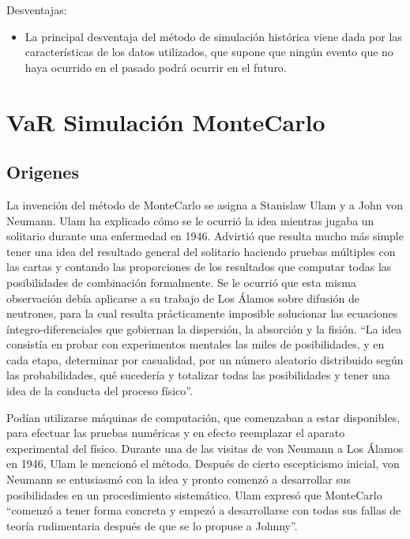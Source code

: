 \documentclass[
  12pt,
]{krantz}
\providecommand{\tightlist}{%
  \setlength{\itemsep}{0pt}\setlength{\parskip}{0pt}}
\begin{document}
Desventajas:

\begin{itemize}
\tightlist
\item
  La principal desventaja del método de simulación histórica viene dada por las características de los datos utilizados, que supone que ningún evento que no haya ocurrido en el pasado podrá ocurrir en el futuro.
\end{itemize}

\hypertarget{var-simulacion-montecarlo}{%
\section{VaR Simulación MonteCarlo}\label{var-simulacion-montecarlo}}

\hypertarget{origenes}{%
\subsection{Origenes}\label{origenes}}

La invención del método de MonteCarlo se asigna a Stanislaw Ulam y a John von Neumann. Ulam ha explicado cómo se le ocurrió la idea mientras jugaba un solitario durante una enfermedad en 1946. Advirtió que resulta mucho más simple tener una idea del resultado general del solitario haciendo pruebas múltiples con las cartas y contando las proporciones de los resultados que computar todas las posibilidades de combinación formalmente. Se le ocurrió que esta misma observación debía aplicarse a su trabajo de Los Álamos sobre difusión de neutrones, para la cual resulta prácticamente imposible solucionar las ecuaciones íntegro-diferenciales que gobiernan la dispersión, la absorción y la fisión. ``La idea consistía en probar con experimentos mentales las miles de posibilidades, y en cada etapa, determinar por casualidad, por un número aleatorio distribuido según las probabilidades, qué sucedería y totalizar todas las posibilidades y tener una idea de la conducta del proceso físico''.

Podían utilizarse máquinas de computación, que comenzaban a estar disponibles, para efectuar las pruebas numéricas y en efecto reemplazar el aparato experimental del físico. Durante una de las visitas de von Neumann a Los Álamos en 1946, Ulam le mencionó el método. Después de cierto escepticismo inicial, von Neumann se entusiasmó con la idea y pronto comenzó a desarrollar sus posibilidades en un procedimiento sistemático. Ulam expresó que MonteCarlo ``comenzó a tener forma concreta y empezó a desarrollarse con todas sus fallas de teoría rudimentaria después de que se lo propuse a Johnny''.
\end{document}
